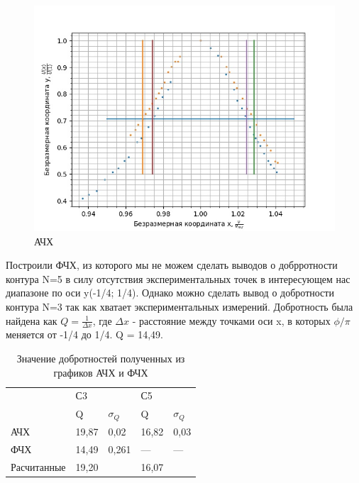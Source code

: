 \documentclass[a4paper, 12pt]{article}
\begin{document}
\begin{center}
\begin{figure}[ht]
\includegraphics[width = 1\textwidth]{jJB4E4wzxKuGV_tEMkuDArz5UldAfYsEJytjUuL7MSHnwpxdwG0k2O6ar_IJf8JQcXOIKiW3mhcx4C-HPjPHD0tj.jpg}
\caption{АЧХ}
\end{figure}
\end{center}
Построили ФЧХ, из которого мы не можем сделать выводов о добрротности контура N=5 в силу отсутствия экспериментальных точек в интересующем нас диапазоне по оси y(-1/4; 1/4). Однако можно сделать вывод о добротности контура N=3 так как хватает экспериментальных измерений. Добротность была найдена как $Q = \frac{1}{\Delta x}$, где $\Delta x$ - расстояние между точками оси x, в которых $\phi / \pi$ меняется от -1/4 до 1/4. Q = 14,49.
\begin{table}[h!]
\centering
\begin{tabular}{|l|ll|ll|}
\hline
\multirow{}{}{} & \multicolumn{2}{l|}{С3}     & \multicolumn{2}{l|}{С5}     \\ \cline{2-5} 
                  & \multicolumn{1}{l|}{Q} & $\sigma_{Q}$ & \multicolumn{1}{l|}{Q} & $\sigma_{Q}$ \\ \hline
АЧХ               & \multicolumn{1}{l|}{19,87} & 0,02   & \multicolumn{1}{l|}{16,82}  & 0,03  \\ \hline
ФЧХ               & \multicolumn{1}{l|}{14,49}  &  0,261 & \multicolumn{1}{l|}{---}  &  ---  \\ \hline
Расчитанные       & \multicolumn{1}{l|}{19,20}  &    & \multicolumn{1}{l|}{16,07}  &    \\ \hline
\end{tabular}
\caption{Значение добротностей полученных из графиков АЧХ и ФЧХ}
\end{table}
\end{document}
